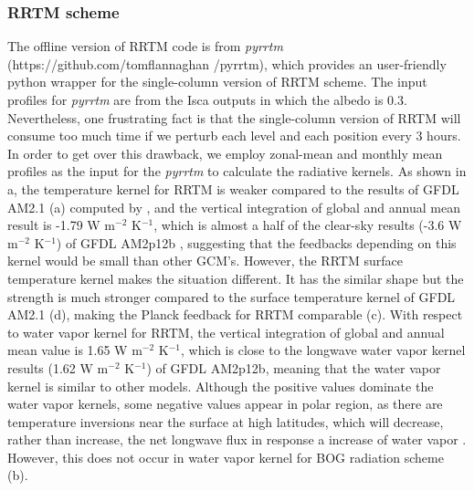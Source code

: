 \subsubsection{RRTM scheme} The offline version of RRTM code is from \textit{pyrrtm} (https://github.com/tomflannaghan /pyrrtm), which provides an user-friendly python wrapper for the single-column version of RRTM scheme. The input profiles for \textit{pyrrtm} are from the Isca outputs in which the albedo is 0.3. Nevertheless, one frustrating fact is that the single-column version of RRTM will consume too much time if we perturb each level and each position every 3 hours. In order to get over this drawback, we employ zonal-mean and monthly mean profiles as the input for the \textit{pyrrtm} to calculate the radiative kernels. As shown in a, the temperature kernel for RRTM is weaker compared to the results of GFDL AM2.1 (a) computed by \cite{Feldl2017}, and the vertical integration of global and annual mean result is -1.79 W m$^{-2}$ K$^{-1}$, which is almost a half of the clear-sky results (-3.6 W m$^{-2}$ K$^{-1}$) of GFDL AM2p12b \citep{Soden2008}, suggesting that the feedbacks depending on this kernel would be small than other GCM's. However, the RRTM surface temperature kernel makes the situation different. It has the similar shape but the strength is much stronger compared to the surface temperature kernel of GFDL AM2.1 (d), making the Planck feedback for RRTM comparable (c). With respect to water vapor kernel for RRTM, the vertical integration of global and annual mean value is 1.65 W m$^{-2}$ K$^{-1}$, which is close to the longwave water vapor kernel results (1.62 W m$^{-2}$ K$^{-1}$) of GFDL AM2p12b, meaning that the water vapor kernel is similar to other models. Although the positive values dominate the water vapor kernels, some negative values appear in polar region, as there are temperature inversions near the surface at high latitudes, which will decrease, rather than increase, the net longwave flux in response a increase of water vapor \citep{Soden2008}. However, this does not occur in water vapor kernel for BOG radiation scheme (b).

